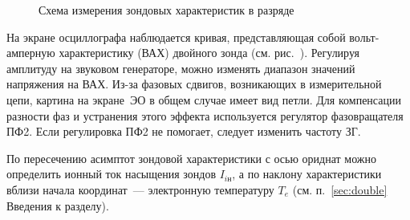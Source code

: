 \begin{figure}[h!]
    \centering
    \caption{Схема измерения зондовых характеристик в разряде}
\end{figure}

На экране осциллографа наблюдается кривая, представляющая собой вольт-амперную
характеристику (ВАХ) двойного зонда (см. рис.~).
Регулируя амплитуду на звуковом генераторе, можно изменять диапазон значений
напряжения  на ВАХ. Из-за фазовых сдвигов, возникающих в измерительной цепи, 
картина на экране~ЭО в общем случае имеет вид петли.
Для компенсации разности фаз и устранения этого эффекта 
используется регулятор фазовращателя ПФ2. Если регулировка ПФ2 не помогает,
следует изменить частоту ЗГ.

По пересечению асимптот зондовой характеристики с осью ориднат
можно определить ионный ток насыщения зондов $I_{iн}$, а по наклону 
характеристики вблизи начала координат~--- электронную температуру $T_e$
(см. п.~\ref{sec:double} Введения к разделу).




